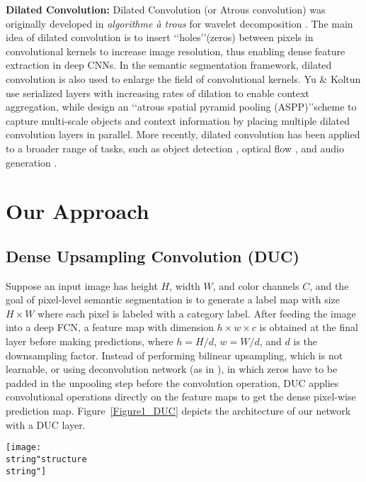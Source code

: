 \documentclass[10pt,twocolumn,letterpaper]{article}
\begin{document}
\textbf{Dilated Convolution:} Dilated Convolution (or Atrous convolution) was originally developed in \textit{algorithme \`{a} trous} for wavelet decomposition \cite{holschneider1990real}. The main idea of dilated convolution is to insert \lq\lq holes\rq\rq (zeros) between pixels in convolutional kernels to increase image resolution, thus enabling dense feature extraction in deep CNNs. In the semantic segmentation framework, dilated convolution is also used to enlarge the field of convolutional kernels. Yu \& Koltun \cite{yu2015multi} use serialized layers with increasing rates of dilation to enable context aggregation, while \cite{chen2016deeplab} design an \lq\lq atrous spatial pyramid pooling (ASPP)\rq\rq scheme to capture multi-scale objects and context information by placing multiple dilated convolution layers in parallel. More recently, dilated convolution has been applied to a broader range of tasks, such as object detection \cite{dai2016r}, optical flow \cite{sevilla2016optical}, and audio generation \cite{wavenet}.

\section{Our Approach}
\subsection{Dense Upsampling Convolution (DUC)}
Suppose an input image has height $H$, width $W$, and color channels $C$, and the goal of pixel-level semantic segmentation is to generate a label map with size $H\times{W}$ where each pixel is labeled with a category label. After feeding the image into a deep FCN, a feature map with dimension $h\times{w}\times{c}$ is obtained at the final layer before making predictions, where $h=H/d$, $w=W/d$, and $d$ is the downsampling factor. Instead of performing bilinear upsampling, which is not learnable, or using deconvolution network (as in \cite{noh2015learning}), in which zeros have to be padded in the unpooling step before the convolution operation, DUC applies convolutional operations directly on the feature maps to get the dense pixel-wise prediction map. Figure~\ref{Figure1_DUC} depicts the architecture of our network with a DUC layer.

\begin{figure*}[t]
\begin{center}
\texttt{[image: \\string"structure\\string"]}
\end{center}
\caption{Illustration of the architecture of ResNet-101 network with Hybrid Dilated Convolution (HDC) and Dense Upsampling Convolution (DUC) layer. HDC is applied within ResNet blocks, and DUC is applied on top of network and is used for decoding purpose.}
\label{Figure1_DUC}
\vspace{-1pt}
\end{figure*}
\end{document}
